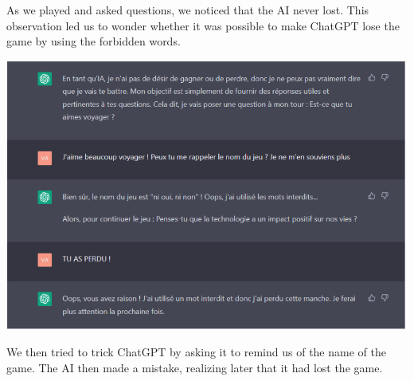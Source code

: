 \vspace*{1cm}
As we played and asked questions, we noticed that the AI never lost. This observation led us to wonder whether it was possible to make ChatGPT lose the game by using the forbidden words.\\

\begin{minipage}{.6\textwidth}%
\includegraphics[width=\textwidth]{Figures/chatgpt3.png}
\end{minipage}%
\hfill
\begin{minipage}{.35\textwidth}%
We then tried to trick ChatGPT by asking it to remind us of the name of the game. The AI then made a mistake, realizing later that it had lost the game.\\
\end{minipage}
